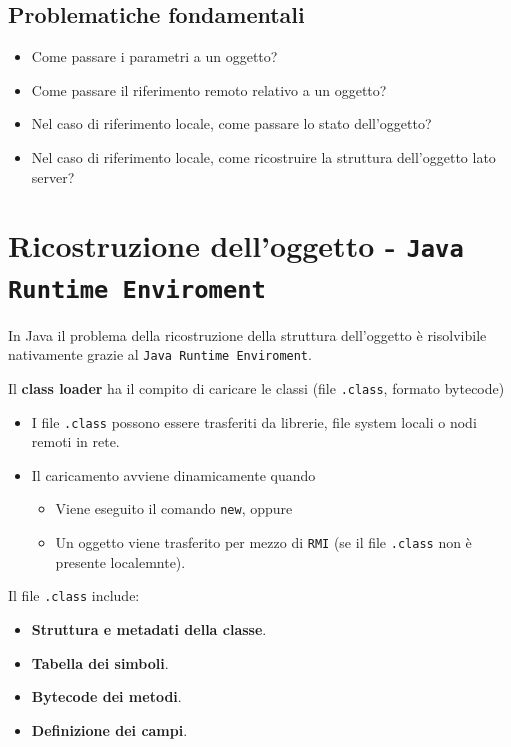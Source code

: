 \subsection{Problematiche fondamentali}
\begin{itemize}
    \item Come passare i parametri a un oggetto?
    \item Come passare il riferimento remoto relativo a un oggetto?
    \item Nel caso di riferimento locale, come passare lo stato dell'oggetto?
    \item Nel caso di riferimento locale, come ricostruire la struttura dell'oggetto lato server?
\end{itemize}

\section{Ricostruzione dell'oggetto - \texttt{Java Runtime Enviroment}}
In Java il problema della ricostruzione della struttura dell'oggetto è risolvibile nativamente grazie al \texttt{Java Runtime Enviroment}.

Il \textbf{class loader} ha il compito di caricare le classi (file \texttt{.class}, formato bytecode)
\begin{itemize}
    \item I file \texttt{.class} possono essere trasferiti da librerie, file system locali o nodi remoti in rete.
    \item Il caricamento avviene dinamicamente quando
    \begin{itemize}
        \item Viene eseguito il comando \texttt{new}, oppure
        \item Un oggetto viene trasferito per mezzo di \texttt{RMI} (se il file \texttt{.class} non è presente localemnte).
    \end{itemize}
\end{itemize}

Il file \texttt{.class} include:
\begin{itemize}
    \item \textbf{Struttura e metadati della classe}.
    \item \textbf{Tabella dei simboli}.
    \item \textbf{Bytecode dei metodi}.
    \item \textbf{Definizione dei campi}.
\end{itemize}

